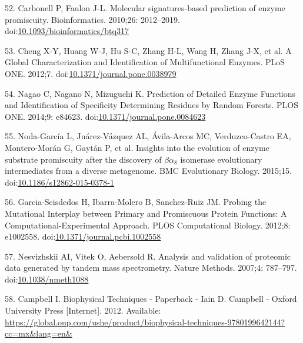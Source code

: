 \documentclass[12pt,twoside]{reedthesis}
\begin{document}
  \hypertarget{ref-carbonellux5fmolecularux5f2010}{}
  52. Carbonell P, Faulon J-L. Molecular signatures-based prediction of
  enzyme promiscuity. Bioinformatics. 2010;26: 2012--2019.
  doi:\href{https://doi.org/10.1093/bioinformatics/btq317}{10.1093/bioinformatics/btq317}
  
  \hypertarget{ref-chengux5fglobalux5f2012}{}
  53. Cheng X-Y, Huang W-J, Hu S-C, Zhang H-L, Wang H, Zhang J-X, et al. A
  Global Characterization and Identification of Multifunctional Enzymes.
  PLoS ONE. 2012;7.
  doi:\href{https://doi.org/10.1371/journal.pone.0038979}{10.1371/journal.pone.0038979}
  
  \hypertarget{ref-nagaoux5fpredictionux5f2014}{}
  54. Nagao C, Nagano N, Mizuguchi K. Prediction of Detailed Enzyme
  Functions and Identification of Specificity Determining Residues by
  Random Forests. PLOS ONE. 2014;9: e84623.
  doi:\href{https://doi.org/10.1371/journal.pone.0084623}{10.1371/journal.pone.0084623}
  
  \hypertarget{ref-noda-garciaux5finsightsux5f2015}{}
  55. Noda-García L, Juárez-Vázquez AL, Ávila-Arcos MC, Verduzco-Castro
  EA, Montero-Morán G, Gaytán P, et al. Insights into the evolution of
  enzyme substrate promiscuity after the discovery of \(\beta\alpha_8\)
  isomerase evolutionary intermediates from a diverse metagenome. BMC
  Evolutionary Biology. 2015;15.
  doi:\href{https://doi.org/10.1186/s12862-015-0378-1}{10.1186/s12862-015-0378-1}
  
  \hypertarget{ref-garcia-seisdedosux5fprobingux5f2012}{}
  56. Garcia-Seisdedos H, Ibarra-Molero B, Sanchez-Ruiz JM. Probing the
  Mutational Interplay between Primary and Promiscuous Protein Functions:
  A Computational-Experimental Approach. PLOS Computational Biology.
  2012;8: e1002558.
  doi:\href{https://doi.org/10.1371/journal.pcbi.1002558}{10.1371/journal.pcbi.1002558}
  
  \hypertarget{ref-nesvizhskiiux5fanalysisux5f2007}{}
  57. Nesvizhskii AI, Vitek O, Aebersold R. Analysis and validation of
  proteomic data generated by tandem mass spectrometry. Nature Methods.
  2007;4: 787--797.
  doi:\href{https://doi.org/10.1038/nmeth1088}{10.1038/nmeth1088}
  
  \hypertarget{ref-campbellux5fbiophysicalux5f2012}{}
  58. Campbell I. Biophysical Techniques - Paperback - Iain D. Campbell -
  Oxford University Press {[}Internet{]}. 2012. Available:
  \url{https://global.oup.com/ushe/product/biophysical-techniques-9780199642144?cc=mx\&lang=en\&}
  
\end{document}
